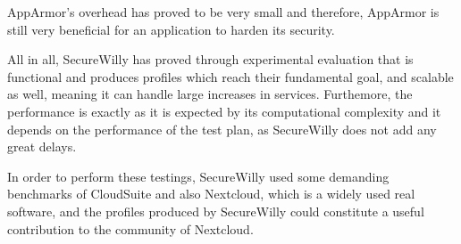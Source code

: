 AppArmor's overhead has proved to be very small and therefore, AppArmor is still very beneficial for an application to harden its security.

All in all, SecureWilly has proved through experimental evaluation that is functional and produces profiles which reach their fundamental goal, and scalable as well, meaning it can handle large increases in services. Furthemore, the performance is exactly as it is expected by its computational complexity and it depends on the performance of the test plan, as SecureWilly does not add any great delays.

In order to perform these testings, SecureWilly used some demanding benchmarks of CloudSuite and also Nextcloud, which is a widely used real software, and the profiles produced by SecureWilly could constitute a useful contribution to the community of Nextcloud.
